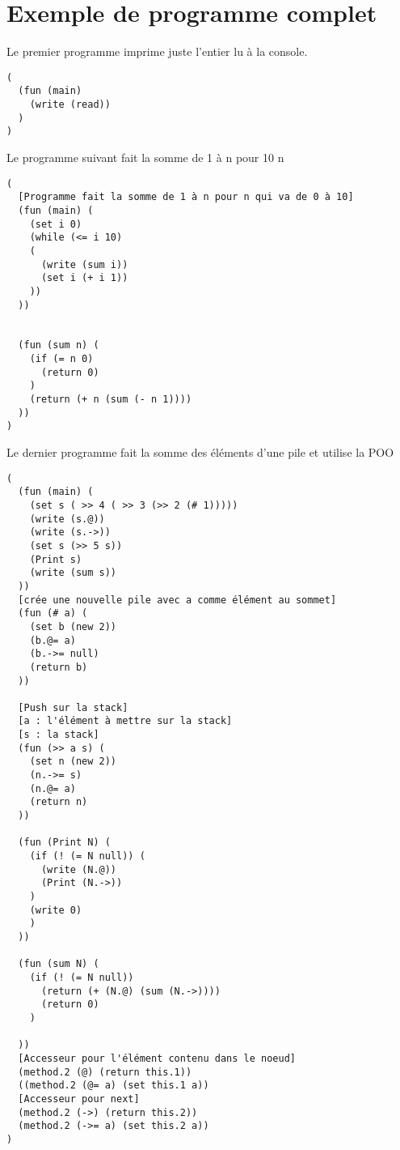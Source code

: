 \section{Exemple de programme complet}
Le premier programme imprime juste l'entier lu à la console.

\begin{verbatim}
(
  (fun (main) 
    (write (read))
  )
)
\end{verbatim}

Le programme suivant fait la somme de 1 à n pour 10 n
\begin{verbatim}
(
  [Programme fait la somme de 1 à n pour n qui va de 0 à 10]
  (fun (main) (
    (set i 0)
    (while (<= i 10)
    (
      (write (sum i))
      (set i (+ i 1))
    ))
  ))


  (fun (sum n) (
    (if (= n 0)
      (return 0)
    )
    (return (+ n (sum (- n 1))))
  ))
)

\end{verbatim}



Le dernier programme fait la somme des éléments d'une pile et utilise la POO
\begin{verbatim}
(
  (fun (main) (
    (set s ( >> 4 ( >> 3 (>> 2 (# 1)))))
    (write (s.@))
    (write (s.->))
    (set s (>> 5 s))
    (Print s)
    (write (sum s))
  ))
  [crée une nouvelle pile avec a comme élément au sommet]
  (fun (# a) (
    (set b (new 2))
    (b.@= a)
    (b.->= null)
    (return b)
  ))

  [Push sur la stack]
  [a : l'élément à mettre sur la stack]
  [s : la stack]
  (fun (>> a s) (
    (set n (new 2))
    (n.->= s)
    (n.@= a)
    (return n)
  )) 

  (fun (Print N) (
    (if (! (= N null)) (
      (write (N.@))
      (Print (N.->))
    )
    (write 0)
    )
  ))

  (fun (sum N) (
    (if (! (= N null)) 
      (return (+ (N.@) (sum (N.->))))
      (return 0)
    )
     
  ))
  [Accesseur pour l'élément contenu dans le noeud]
  (method.2 (@) (return this.1))
  ((method.2 (@= a) (set this.1 a))
  [Accesseur pour next]
  (method.2 (->) (return this.2))
  (method.2 (->= a) (set this.2 a))
)
\end{verbatim}




 